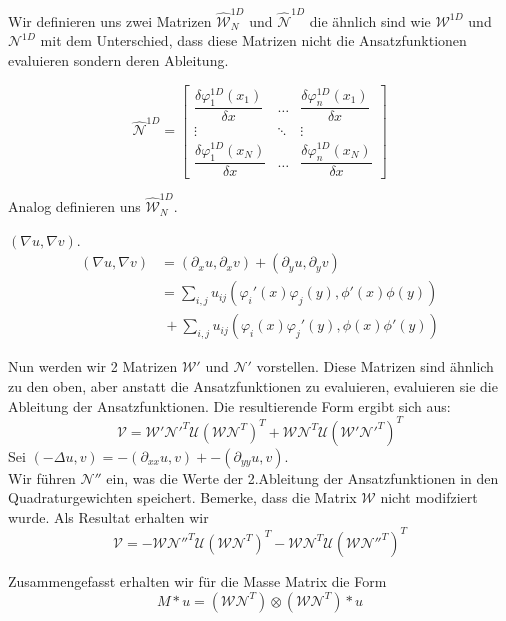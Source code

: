 Wir definieren uns zwei Matrizen $\widehat{\mathcal{W}}^{1D}_N$ und $\widehat{\mathcal{N}}^{1D}$ die ähnlich sind wie $\mathcal{W}^{1D}$ und $\mathcal{N}^{1D}$ mit dem Unterschied, dass diese Matrizen nicht die Ansatzfunktionen evaluieren sondern deren Ableitung.

\begin{equation}
\widehat{\mathcal{N}}^{1D} = 
\begin{bmatrix}
\dfrac{\delta \varphi^{1D}_1(x_1)}{\delta x} & \hdots & \dfrac{ \delta \varphi^{1D}_n(x_1)}{\delta x} \\
\vdots & \ddots & \vdots \\
\dfrac{\delta \varphi^{1D}_1(x_{N})}{\delta x} & \hdots & \dfrac{ \delta \varphi^{1D}_n(x_{N})}{\delta x}
\end{bmatrix}
\end{equation}

Analog definieren uns $\widehat{\mathcal{W}}^{1D}_N$.



\newpage
$(\nabla u, \nabla v)$.
\begin{align}
(\nabla u, \nabla v) &=(\partial_x u,\partial_x v) + (\partial_y u,\partial_y v) \\
					   &=\sum_{i,j} u_{ij} (\varphi_i'(x)\varphi_j(y),\phi'(x)\phi(y)) \\
					   & \ + \sum_{i,j} u_{ij} (\varphi_i(x)\varphi_j'(y),\phi(x)\phi'(y))
\end{align}

Nun werden wir 2 Matrizen  $\mathcal{W}'$ und $\mathcal{N}'$ vorstellen.
Diese Matrizen sind ähnlich zu den oben, aber anstatt die Ansatzfunktionen zu evaluieren, evaluieren sie die Ableitung der Ansatzfunktionen. Die resultierende Form ergibt sich aus:
\[\mathcal{V}=\mathcal{W}' \mathcal{N}'^T \mathcal{U} (\mathcal{W} \mathcal{N}^T)^T +\mathcal{W} \mathcal{N}^T \mathcal{U} (\mathcal{W}' \mathcal{N}'^T)^T\]
Sei $(-\Delta u, v)=-(\partial_{xx} u,v) + -(\partial_{yy} u,v)$.\\
Wir führen $\mathcal{N}''$ ein, was die Werte der 2.Ableitung der Ansatzfunktionen in den Quadraturgewichten speichert. Bemerke, dass die Matrix $\mathcal{W}$ nicht modifziert wurde. Als Resultat erhalten wir
\[\mathcal{V}=-\mathcal{W} \mathcal{N}''^T \mathcal{U} (\mathcal{W} \mathcal{N}^T)^T -\mathcal{W} \mathcal{N}^T \mathcal{U} (\mathcal{W} \mathcal{N}''^T)^T\]


Zusammengefasst erhalten wir für die Masse Matrix die Form
\begin{equation}
M*u = (\mathcal{W} \mathcal{N}^{T}) \otimes (\mathcal{W} \mathcal{N}^{T})*u
\end{equation}

